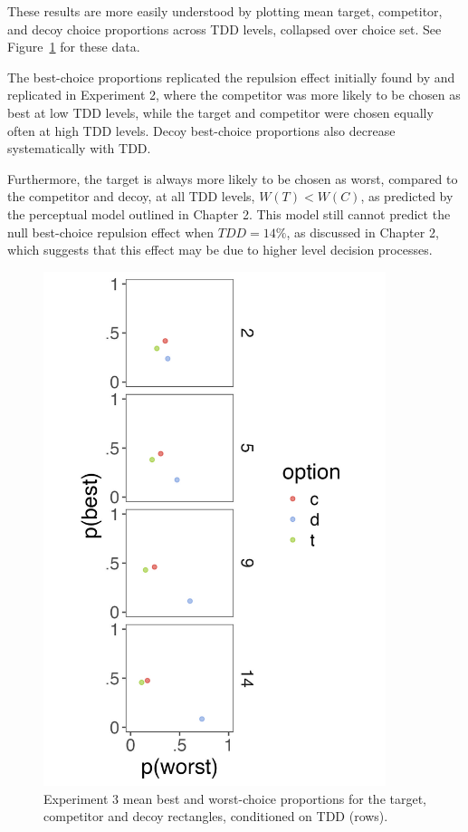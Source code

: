 These results are more easily understood by plotting mean target, competitor, and decoy choice proportions across TDD levels, collapsed over choice set. See Figure~\ref{fig:bw_mean_choice_collapsed} for these data. 

The best-choice proportions replicated the repulsion effect initially found by \textcite{spektorWhenGoodLooks2018b} and replicated in Experiment 2, where the competitor was more likely to be chosen as best at low TDD levels, while the target and competitor were chosen equally often at high TDD levels. Decoy best-choice proportions also decrease systematically with TDD. 

Furthermore, the target is always more likely to be chosen as worst, compared to the competitor and decoy, at all TDD levels, $W(T)<W(C)$, as predicted by the perceptual model outlined in Chapter 2. This model still cannot predict the null best-choice repulsion effect when $TDD=14\%$, as discussed in Chapter 2, which suggests that this effect may be due to higher level decision processes.

\begin{figure}
   \includegraphics[width=100mm]{figures/crit_mean_props_by_dist.jpeg}
   \caption{Experiment 3 mean best and worst-choice proportions for the target, competitor and decoy rectangles, conditioned on TDD (rows).}
   \label{fig:bw_mean_choice_collapsed}
\end{figure}


